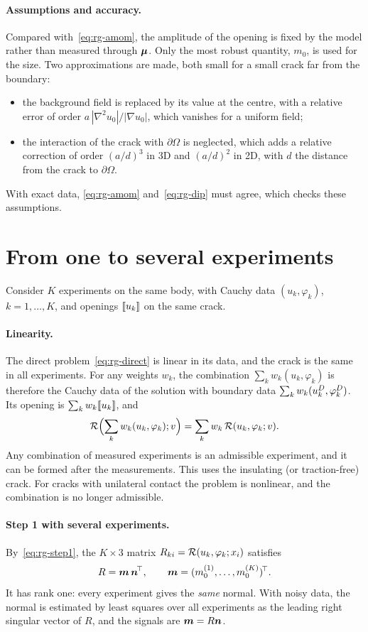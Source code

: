 \paragraph{Assumptions and accuracy.} Compared with~\eqref{eq:rg-amom}, the amplitude of the opening is fixed by the model rather than measured through $\bm{\mu}$. Only the most robust quantity, $m_0$, is used for the size. Two approximations are made, both small for a small crack far from the boundary:
\begin{itemize}[itemsep=1pt]
\item the background field is replaced by its value at the centre, with a relative error of order $a\,|\nabla^2u_0|/|\nabla u_0|$, which vanishes for a uniform field;
\item the interaction of the crack with $\partial\Omega$ is neglected, which adds a relative correction of order $(a/d)^3$ in 3D and $(a/d)^2$ in 2D, with $d$ the distance from the crack to $\partial\Omega$.
\end{itemize}
With exact data, \eqref{eq:rg-amom} and~\eqref{eq:rg-dip} must agree, which checks these assumptions.

\section{From one to several experiments}\label{sec:rg-multi}
%
Consider $K$ experiments on the same body, with Cauchy data $(u_k,\varphi_k)$, $k=1,\dots,K$, and openings $[\![u_k]\!]$ on the same crack.

\paragraph{Linearity.} The direct problem~\eqref{eq:rg-direct} is linear in its data, and the crack is the same in all experiments. For any weights $w_k$, the combination $\sum_kw_k(u_k,\varphi_k)$ is therefore the Cauchy data of the solution with boundary data $\sum_kw_k(u^{D}_k,\varphi^{D}_k)$. Its opening is $\sum_kw_k[\![u_k]\!]$, and
\[
\mathcal{R}\Bigl(\sum_kw_k(u_k,\varphi_k);v\Bigr)=\sum_kw_k\,\mathcal{R}(u_k,\varphi_k;v).
\]
Any combination of measured experiments is an admissible experiment, and it can be formed after the measurements. This uses the insulating (or traction-free) crack. For cracks with unilateral contact the problem is nonlinear, and the combination is no longer admissible.

\paragraph{Step 1 with several experiments.} By~\eqref{eq:rg-step1}, the $K\times3$ matrix $R_{ki}=\mathcal{R}(u_k,\varphi_k;x_i)$ satisfies
\[
R=\bm{m}\,\bm{n}^{\!\top},\qquad \bm{m}=(m_0^{(1)},\dots,m_0^{(K)})^{\!\top} .
\]
It has rank one: every experiment gives the \emph{same} normal. With noisy data, the normal is estimated by least squares over all experiments as the leading right singular vector of $R$, and the signals are $\bm{m}=R\bm{n}$.

